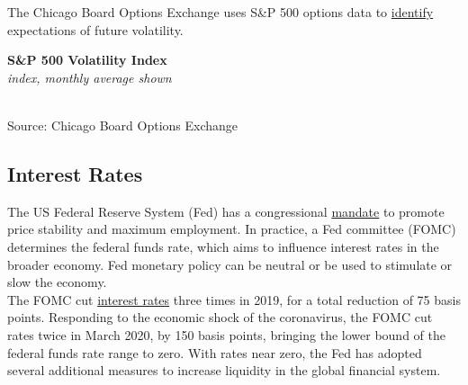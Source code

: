 \documentclass{report}
\makeatletter
\newcommand{\tbllink}[1]{\href{https://raw.githubusercontent.com/bdecon/US-chartbook/master/chartbook/data/#1}{\faTable}}
\newcommand*\short[1]{\expandafter\@gobbletwo\number\numexpr#1\relax}
\newcommand{\dateaxisticks}{
		date coordinates in=x, axis line style={draw=none},
		xmax={2020-05-10},
		max space between ticks=40,	    
		xtick={{1990-01-01}, {1992-01-01}, {1994-01-01}, 
			{1996-01-01}, {1998-01-01}, {2000-01-01}, 
			{2002-01-01}, {2004-01-01}, {2006-01-01},
			{2008-01-01}, {2010-01-01}, {2012-01-01}, {2014-01-01},
		    {2016-01-01}, {2018-01-01}, {2020-01-01}},
		minor xtick={{1989-01-01}, {1991-01-01}, {1993-01-01},
			{1995-01-01}, {1997-01-01}, {1999-01-01}, 
			{2001-01-01}, {2003-01-01}, {2005-01-01}, {2007-01-01},
		    {2009-01-01}, {2011-01-01}, {2013-01-01}, {2015-01-01},
		    {2017-01-01}, {2019-01-01}},
		enlarge y limits={0.06}, enlarge x limits={0.01},
		}
\newcommand{\bbar}[2]{extra #1 ticks = {{#2}}, extra #1 tick labels = ,
		extra #1 tick style = {grid=major, grid style={thick, black!25}},}
\newcommand{\stdline}[4]{\addplot[very thick, no markers, color=#1] 
		table [x=#2, y=#3, col sep=comma] {#4};	}
\newcommand{\rbars}{
		\fill[color=black!10] (axis cs:{1990-07-01},\pgfkeysvalueof{/pgfplots/ymin}) rectangle 
			(axis cs:{1991-03-01}, \pgfkeysvalueof{/pgfplots/ymax});
		\fill[color=black!10] (axis cs:{2007-12-01},\pgfkeysvalueof{/pgfplots/ymin}) rectangle 
			(axis cs:{2009-07-01}, \pgfkeysvalueof{/pgfplots/ymax});
		\fill[color=black!10] (axis cs:{2001-03-01},\pgfkeysvalueof{/pgfplots/ymin}) rectangle 
			(axis cs:{2001-11-01}, \pgfkeysvalueof{/pgfplots/ymax});}
\makeatother
\begin{document}
{{{{{{{{{\begin{minipage}{0.76\textwidth}
\small The Chicago Board Options Exchange uses S\&P 500 options data to \href{http://www.cboe.com/vix}{identify} expectations of future volatility. \\

\vspace{2mm}

\noindent \normalsize \textbf{S\&P 500 Volatility Index}\\
\footnotesize{\textit{index, monthly average shown}}\\ 
\noindent \hspace*{-2mm} \\
\footnotesize{Source: Chicago Board Options Exchange} \hfill \tbllink{vix.csv}
\end{minipage}

\newpage

\begin{minipage}{0.76\textwidth}

\subsection*{\color{black!70} \seriffont Interest Rates}

\small The US Federal Reserve System (Fed) has a congressional \href{https://www.federalreserve.gov/faqs/money_12848.htm}{mandate} to promote price stability and maximum employment. In practice, a Fed committee (FOMC) determines the federal funds rate, which aims to influence interest rates in the broader economy. Fed monetary policy can be neutral or be used to stimulate or slow the economy.\\

The FOMC cut \href{https://www.federalreserve.gov/releases/h15/}{interest rates} three times in 2019, for a total reduction of 75 basis points. Responding to the economic shock of the coronavirus, the FOMC cut rates twice in March 2020, by 150 basis points, bringing the lower bound of the federal funds rate range to zero. With rates near zero, the Fed has adopted several additional measures to increase liquidity in the global financial system.\\


\end{minipage}}}}}}}}}}
\end{document}
